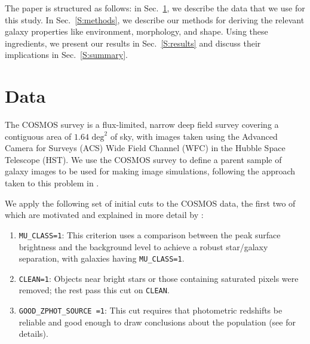\documentclass[twocolumn,useAMS,usenatbib]{mn2e}
\newcommand{\rachel}[1]{{\textcolor{red}{#1}}}
\newcommand{\arun}[1]{{\textcolor{blue}{#1}}}
\begin{document}
The paper is structured as follows: in Sec.~\ref{S:data}, we describe
the data that we use for this study.  In Sec.~\ref{S:methods}, we
describe our methods for deriving the relevant galaxy properties
like environment, morphology, and shape.  
Using these ingredients, we present our results in Sec.~\ref{S:results}
and discuss their implications in Sec.~\ref{S:summary}.
\section{Data}
\label{S:data}
The COSMOS survey \citep{COSMOS_overview, COSMOS_generic, COSMOS_Alexie} is a flux-limited, narrow deep field survey covering a contiguous area of $1.64 \text{ deg}^2$ of sky, with images taken using the Advanced Camera for Surveys (ACS) Wide Field Channel (WFC)
in the Hubble Space Telescope (HST).  We use the COSMOS survey to
define a parent sample of galaxy images to be used for making image
simulations, following the approach taken to this problem in
\cite{2012MNRAS.420.1518M,great3}.

We apply the following set of initial cuts to the COSMOS data, the
first two of which
are motivated and explained in more detail by \cite{COSMOS_Alexie}:
\begin{enumerate}
 \item \texttt{MU\_CLASS=1}: This criterion uses a comparison between
   the peak surface brightness and the background level to achieve a
   robust star/galaxy separation, with galaxies having \texttt{MU\_CLASS=1}. 
 \item \texttt{CLEAN=1}: Objects near bright stars or those containing
   saturated pixels were removed; the rest pass this cut on \texttt{CLEAN}. 
 \item \texttt{GOOD\_ZPHOT\_SOURCE =1}: This cut requires that
   photometric redshifts be reliable and good enough to draw
   conclusions about the population (see \citealt{2012MNRAS.420.1518M}
   for details).
\end{enumerate}
\end{document}
